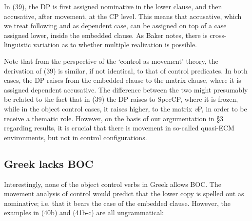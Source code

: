 \documentclass[output=paper]{langsci/langscibook}
\begin{document}
In (39), the DP is first assigned nominative in the lower clause, and then accusative, after movement, at the CP level. This means that accusative, which we treat following \citet{Marantz1991} and \citet{Baker2015} as dependent case, can be assigned on top of a case assigned lower, inside the embedded clause. As Baker notes, there is cross-linguistic variation as to whether multiple realization is possible. 

Note that from the perspective of the ‘control as movement’ theory, the derivation of (39) is similar, if not identical, to that of control predicates. In both cases, the DP raises from the embedded clause to the matrix clause, where it is assigned dependent accusative. The difference between the two might presumably be related to the fact that in (39) the DP raises to SpecCP, where it is frozen, while in the object control cases, it raises higher, to the matrix \textit{v}P, in order to be receive a thematic role. However, on the basis of our argumentation in §3 regarding  results, it is crucial that there is movement in so-called quasi-ECM environments, but not in control configurations. 

\subsection{Greek lacks BOC}%

Interestingly, none of the object control verbs in Greek allows BOC. The movement analysis of control would predict that the lower copy is spelled out as nominative; i.e. that it bears the case of the embedded clause. However, the examples in (40b) and (41b-c) are all ungrammatical:



\ea%
    \label{ex:alexiadou:47}
    \z
\z    
\end{document}
